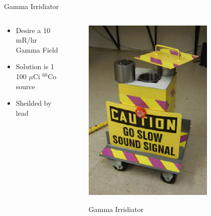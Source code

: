 \begin{frame}{Gamma Irridiator}
\begin{columns}[onlytextwidth]
\begin{column}{0.45\textwidth}
	\begin{itemize}
		\item Desire a 10 mR/hr Gamma Field
		\item Solution is 1 100 $\mu$Ci ${}^{60}$Co source
		\item Sheilded by lead
	\end{itemize}
\end{column}
\begin{column}{0.45\textwidth}
	\centering
	\begin{figure}
		\includegraphics[width=0.8\textwidth]{images/GammaIrridiator.eps}
		\label{fig:GammaIrridiator}
		\caption{Gamma Irridiator}
	\end{figure}
\end{column}
\end{columns}
\end{frame}

